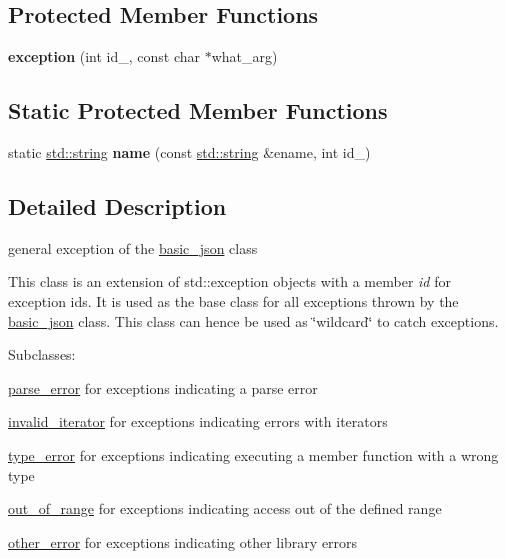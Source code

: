 \subsection*{Protected Member Functions}
\begin{DoxyCompactItemize}
\item 
\mbox{\label{classnlohmann_1_1detail_1_1exception_ae323ad0d53bc724414c2233164e65657}} 
{\bfseries exception} (int id\+\_\+, const char $\ast$what\+\_\+arg)
\end{DoxyCompactItemize}
\subsection*{Static Protected Member Functions}
\begin{DoxyCompactItemize}
\item 
\mbox{\label{classnlohmann_1_1detail_1_1exception_abf41a7e9178356314082284e6cfea278}} 
static \mbox{\hyperlink{namespacenlohmann_1_1detail_a1ed8fc6239da25abcaf681d30ace4985ab45cffe084dd3d20d928bee85e7b0f21}{std\+::string}} {\bfseries name} (const \mbox{\hyperlink{namespacenlohmann_1_1detail_a1ed8fc6239da25abcaf681d30ace4985ab45cffe084dd3d20d928bee85e7b0f21}{std\+::string}} \&ename, int id\+\_\+)
\end{DoxyCompactItemize}


\subsection{Detailed Description}
general exception of the \mbox{\hyperlink{classnlohmann_1_1basic__json}{basic\+\_\+json}} class 

This class is an extension of {\ttfamily std\+::exception} objects with a member {\itshape id} for exception ids. It is used as the base class for all exceptions thrown by the \mbox{\hyperlink{classnlohmann_1_1basic__json}{basic\+\_\+json}} class. This class can hence be used as \char`\"{}wildcard\char`\"{} to catch exceptions.

Subclasses\+:
\begin{DoxyItemize}
\item \mbox{\hyperlink{classnlohmann_1_1detail_1_1parse__error}{parse\+\_\+error}} for exceptions indicating a parse error
\item \mbox{\hyperlink{classnlohmann_1_1detail_1_1invalid__iterator}{invalid\+\_\+iterator}} for exceptions indicating errors with iterators
\item \mbox{\hyperlink{classnlohmann_1_1detail_1_1type__error}{type\+\_\+error}} for exceptions indicating executing a member function with a wrong type
\item \mbox{\hyperlink{classnlohmann_1_1detail_1_1out__of__range}{out\+\_\+of\+\_\+range}} for exceptions indicating access out of the defined range
\item \mbox{\hyperlink{classnlohmann_1_1detail_1_1other__error}{other\+\_\+error}} for exceptions indicating other library errors
\end{DoxyItemize}

